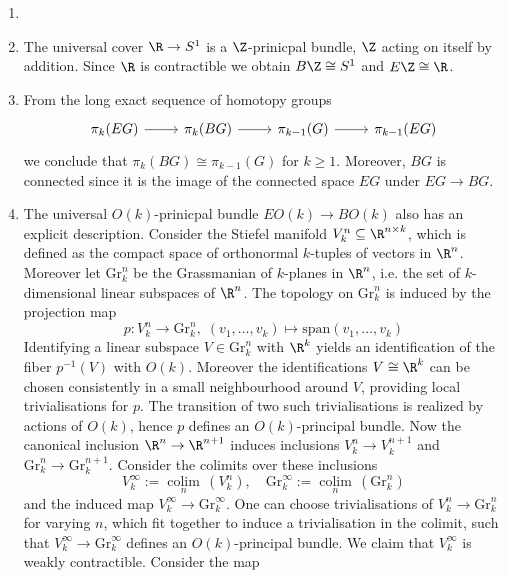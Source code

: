 \begin{example}
    \label{bundles:ex:examples_for_classifiying_spaces}
    \begin{enumerate}[label=(\roman*)]
        \item[]
        \item The universal cover $\R \to S^1$ is a $\Z$-prinicpal bundle, $\Z$ acting on itself by addition. Since $\R$ is contractible we obtain $B\Z \cong S^1$ and $E\Z \cong \R$.
        \item \label{bundles:ex:homotopy_groups_of_BG} From the long exact sequence of homotopy groups 
        \[\begin{tikzcd}
        {\pi_k(EG)} & {\pi_k(BG)} & {\pi_{k-1}(G)} & {\pi_{k-1}(EG)}
        \arrow[from=1-1, to=1-2]
        \arrow[from=1-2, to=1-3]
        \arrow[from=1-3, to=1-4]
        \end{tikzcd}\]
        we conclude that $\pi_k(BG) \cong \pi_{k-1}(G)$ for $k \geq 1$. Moreover, $BG$ is connected since it is the image of the connected space $EG$ under $EG \to BG$.
        \item The universal $O(k)$-prinicpal bundle $EO(k) \to BO(k)$ also has an explicit description. Consider the Stiefel manifold $V_k^n \subseteq \R^{n\times k}$, which is defined as the compact space of orthonormal $k$-tuples of vectors in $\R^n$. Moreover let $\mathrm{Gr}_k^n$ be the Grassmanian of $k$-planes in $\R^n$, i.e. the set of $k$-dimensional linear subspaces of $\R^n$. The topology on $\mathrm{Gr}_k^n$ is induced by the projection map
        \[
        p \colon V_k^n \to \mathrm{Gr}_k^n, \; (v_1,\ldots,v_k) \mapsto \mathrm{span}(v_1,\ldots,v_k)
        \] 
        Identifying a linear subspace $V \in \mathrm{Gr}_k^n$ with $\R^k$ yields an identification of the fiber $p^{-1}(V)$ with $O(k)$. Moreover the identifications $V \cong \R^k$ can be chosen consistently in a small neighbourhood around $V$, providing local trivialisations for $p$. The transition of two such trivialisations is realized by actions of $O(k)$, hence $p$ defines an $O(k)$-principal bundle.
        Now the canonical inclusion $\R^n \to \R^{n+1}$ induces inclusions $V_k^n \to V_k^{n+1}$ and $\mathrm{Gr}_k^n \to \mathrm{Gr}_k^{n+1}$. Consider the colimits over these inclusions 
        \[
        V_k^\infty := \operatorname*{colim}_n\,(V_k^n), \quad \mathrm{Gr}_k^\infty := \operatorname*{colim}_n\,(\mathrm{Gr}_k^n)
        \] 
        and the induced map $V_k^\infty \to \mathrm{Gr}_k^\infty$. One can choose trivialisations of $V_k^n \to \mathrm{Gr}_k^n$ for varying $n$, which fit together to induce a trivialisation in the colimit, such that $V_k^\infty \to \mathrm{Gr}_k^\infty$ defines an $O(k)$-principal bundle. We claim that $V_k^\infty$ is weakly contractible. Consider the map 

\end{enumerate}
\end{example}

